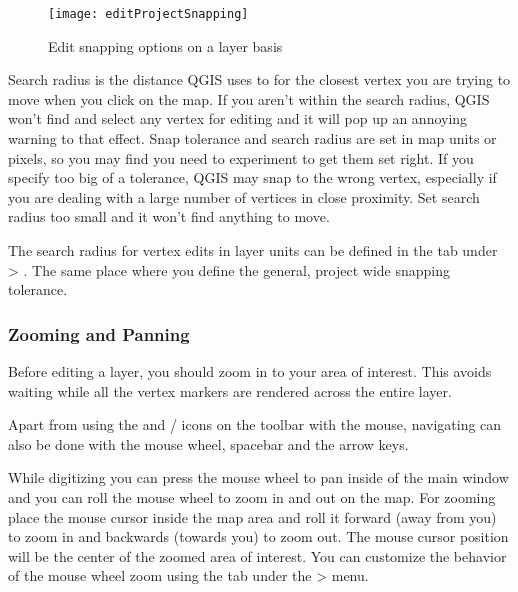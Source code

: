 \begin{figure}[H]
   \begin{center}
   \caption{Edit snapping options on a layer basis \nixcaption}\label{fig:snappingoptions}\smallskip
   \texttt{[image: editProjectSnapping]} 
\end{center}  
\end{figure}


Search radius is the distance QGIS uses to  for the closest
vertex you are trying to move when you click on the
map. If you aren't within the search radius, QGIS won't find and select
any vertex for editing and it will pop up an annoying warning to that effect.
Snap tolerance and search radius are set in map units or pixels, so you may find you
need to experiment to get them set right. If you specify too big of a
tolerance, QGIS may snap to the wrong vertex, especially if you are dealing
with a large number of vertices in close proximity. Set search radius too
small and it won't find anything to move.

The search radius for vertex edits in layer units can be defined in the
 tab under  >
. The same place where you define the
general, project wide snapping tolerance.

\subsubsection{Zooming and Panning}

Before editing a layer, you should zoom in to your area of interest. This
avoids waiting while all the vertex markers are rendered across the entire
layer.

Apart from using the  and
/
icons on the toolbar with the mouse, navigating can also be done with the
mouse wheel, spacebar and the arrow keys.


While digitizing you can press the mouse wheel to pan inside of the main
window and you can roll the mouse wheel to zoom in and out on the map. For
zooming place the mouse cursor inside the map area and roll it forward (away
from you)
to zoom in and backwards (towards you) to zoom out. The mouse cursor position
will
be the center of the zoomed area of interest. You can customize the behavior
of the mouse wheel zoom using the  tab under the
 > menu.

